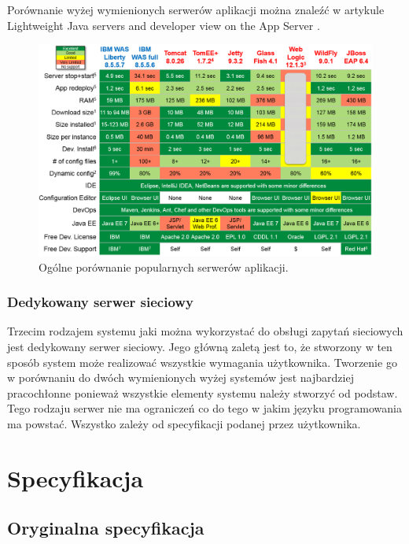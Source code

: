 \documentclass[eng]{mgr}
\begin{document}
			\pagebreak
		
			Porównanie wyżej wymienionych serwerów aplikacji można znaleźć w artykule Lightweight Java servers and developer view on the App Server \cite{javaserverscomparison}.
		
			\begin{center}
				\begin{figure}[H]
					\centering
					\includegraphics[scale=0.55]{weblogic-jboss-wildfly-websphere-liberty-tomee-tomcat-glassfish-comparison1.png}
					\caption{Ogólne porównanie popularnych serwerów aplikacji. \cite{javaserverscomparison}}
				\end{figure}
			\end{center}
		
			\subsection{Dedykowany serwer sieciowy}
			Trzecim rodzajem systemu jaki można wykorzystać do obsługi zapytań sieciowych jest dedykowany serwer sieciowy. Jego główną zaletą jest to, że stworzony w ten sposób system może realizować wszystkie wymagania użytkownika. Tworzenie go w porównaniu do dwóch wymienionych wyżej systemów jest najbardziej pracochłonne ponieważ wszystkie elementy systemu należy stworzyć od podstaw. Tego rodzaju serwer nie ma ograniczeń co do tego w jakim języku programowania ma powstać. Wszystko zależy od specyfikacji podanej przez użytkownika.
			
	
	\chapter{Specyfikacja}
	
		\section{Oryginalna specyfikacja}
		
\end{document}
